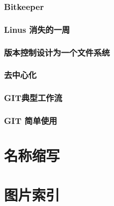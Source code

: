 \documentclass[amstex,twoside]{ctexbook}
\begin{document}
\subsection{  Bitkeeper	}
\subsection{  Linus 消失的一周	}
\subsection{  版本控制设计为一个文件系统	}
\subsection{ 去中心化	}
\subsection{  GIT典型工作流	}
\subsection{  GIT 简单使用	}


\appendix



\chapter{ 名称缩写	}
\chapter{ 图片索引	}


\end{document}
